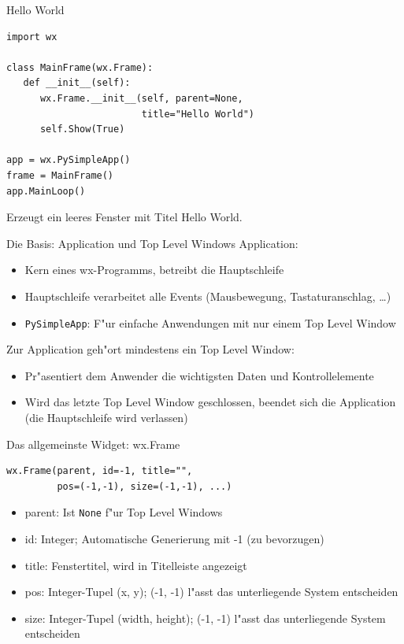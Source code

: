 \begin{frame}[fragile]{Hello World}
\begin{lstlisting}[style=Python]
import wx

class MainFrame(wx.Frame):
   def __init__(self):
      wx.Frame.__init__(self, parent=None, 
                        title="Hello World")
      self.Show(True)

app = wx.PySimpleApp()
frame = MainFrame()
app.MainLoop()
\end{lstlisting}
Erzeugt ein leeres Fenster mit Titel \glqq Hello World\grqq.
\end{frame}

\begin{frame}{Die Basis: Application und Top Level Windows}
\alert{Application:}
\begin{itemize}
\item Kern eines wx-Programms, betreibt die \alert{Hauptschleife}
\item Hauptschleife verarbeitet alle \alert{Events} (Mausbewegung, Tastaturanschlag, \dots)
\item \lstinline{PySimpleApp}: F"ur einfache Anwendungen mit nur einem Top Level Window
\end{itemize}
\vspace{3mm}
Zur Application geh"ort mindestens ein \alert{Top Level Window}:
\begin{itemize}
\item Pr"asentiert dem Anwender die wichtigsten Daten und Kontrollelemente
\item Wird das letzte Top Level Window geschlossen, beendet sich die Application (die Hauptschleife wird verlassen)
\end{itemize}
\end{frame}

\begin{frame}[fragile]{Das allgemeinste Widget: wx.Frame}
\begin{lstlisting}[style=Python]
wx.Frame(parent, id=-1, title="", 
         pos=(-1,-1), size=(-1,-1), ...)
\end{lstlisting}
\begin{itemize}
\item \alert{parent}: Ist \lstinline{None} f"ur Top Level Windows
\item \alert{id}: Integer; Automatische Generierung mit -1 (zu bevorzugen) 
\item \alert{title}: Fenstertitel, wird in Titelleiste angezeigt
\item \alert{pos}: Integer-Tupel (x, y); (-1, -1) l"asst das unterliegende System entscheiden
\item \alert{size}: Integer-Tupel (width, height); (-1, -1) l"asst das unterliegende System entscheiden
\end{itemize}
\end{frame}

